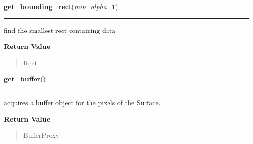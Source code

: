 \hspace{.8\funcindent}\begin{boxedminipage}{\funcwidth}

    \raggedright \textbf{get\_bounding\_rect}(\textit{min\_alpha}={\tt  1})

    \vspace{-1.5ex}

    \rule{\textwidth}{0.5\fboxrule}
\setlength{\parskip}{2ex}
    find the smallest rect containing data

\setlength{\parskip}{1ex}
      \textbf{Return Value}
    \vspace{-1ex}

      \begin{quote}
      Rect

      \end{quote}

    \end{boxedminipage}

    \label{pygame:Surface:get_buffer}

    \vspace{0.5ex}

\hspace{.8\funcindent}\begin{boxedminipage}{\funcwidth}

    \raggedright \textbf{get\_buffer}()

    \vspace{-1.5ex}

    \rule{\textwidth}{0.5\fboxrule}
\setlength{\parskip}{2ex}
    acquires a buffer object for the pixels of the Surface.

\setlength{\parskip}{1ex}
      \textbf{Return Value}
    \vspace{-1ex}

      \begin{quote}
      BufferProxy

      \end{quote}

    \end{boxedminipage}

    \label{pygame:Surface:get_bytesize}

    \vspace{0.5ex}

